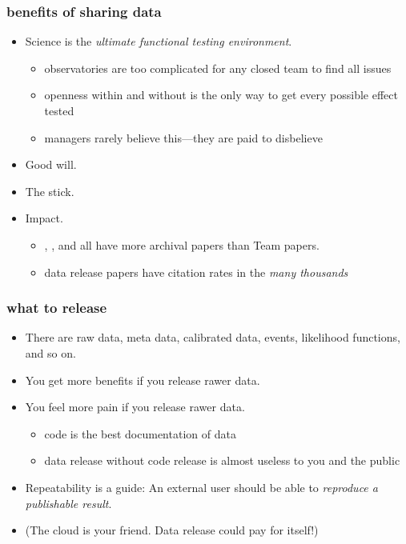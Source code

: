 \documentclass[pdftex]{beamer}
\begin{document}
\begin{frame}
  \frametitle{benefits of sharing data}
  \begin{itemize}
  \item Science is the \emph{ultimate functional testing environment}.
    \begin{itemize}
    \item observatories are too complicated for any closed team to find all issues
    \item openness within and without is the only way to get every possible effect tested
    \item managers rarely believe this---they are paid to disbelieve
    \end{itemize}
  \item Good will.
  \item The stick.
  \item Impact.
    \begin{itemize}
    \item {}, , and  all have more archival papers than Team papers.
    \item data release papers have citation rates in the \emph{many thousands}
    \end{itemize}
  \end{itemize}
\end{frame}

\begin{frame}
  \frametitle{what to release}
  \begin{itemize}
  \item There are raw data, meta data, calibrated data, events, likelihood functions, and so on.
  \item You get more benefits if you release rawer data.
  \item You feel more pain if you release rawer data.
    \begin{itemize}
    \item code is the best documentation of data
    \item data release without code release is almost useless to you and the public
    \end{itemize}
  \item Repeatability is a guide:  An external user should be able to \emph{reproduce a publishable result}.
  \item (The cloud is your friend.  Data release could pay for itself!)
  \end{itemize}
\end{frame}
\end{document}
